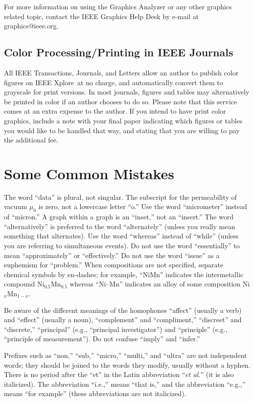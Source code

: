 \documentclass[journal,twoside,web]{ieeecolor}
\begin{document}
For more information on using the Graphics Analyzer or any other graphics
related topic, contact the IEEE Graphics Help Desk by e-mail at
graphics@ieee.org.

\subsection{Color Processing/Printing in IEEE Journals}
All IEEE Transactions, Journals, and Letters allow an author to publish
color figures on IEEE Xplore\textregistered\ at no charge, and automatically
convert them to grayscale for print versions. In most journals, figures and
tables may alternatively be printed in color if an author chooses to do so.
Please note that this service comes at an extra expense to the author. If
you intend to have print color graphics, include a note with your final
paper indicating which figures or tables you would like to be handled that way,
and stating that you are willing to pay the additional fee.

\section{Some Common Mistakes}
The word ``data'' is plural, not singular. The subscript for the
permeability of vacuum $\mu _{0}$ is zero, not a lowercase letter
``o.'' Use the word ``micrometer'' instead of ``micron.'' A graph within a graph is an
``inset,'' not an ``insert.'' The word ``alternatively'' is preferred to the
word ``alternately'' (unless you really mean something that alternates). Use
the word ``whereas'' instead of ``while'' (unless you are referring to
simultaneous events). Do not use the word ``essentially'' to mean
``approximately'' or ``effectively.'' Do not use the word ``issue'' as a
euphemism for ``problem.'' When compositions are not specified, separate
chemical symbols by en-dashes; for example, ``NiMn'' indicates the
intermetallic compound Ni$_{0.5}$Mn$_{0.5}$ whereas
``Ni--Mn'' indicates an alloy of some composition
Ni$_{x}$Mn$_{1-x}$.

Be aware of the different meanings of the homophones ``affect'' (usually a
verb) and ``effect'' (usually a noun), ``complement'' and ``compliment,''
``discreet'' and ``discrete,'' ``principal'' (e.g., ``principal
investigator'') and ``principle'' (e.g., ``principle of measurement''). Do
not confuse ``imply'' and ``infer.''

Prefixes such as ``non,'' ``sub,'' ``micro,'' ``multi,'' and ``ultra'' are
not independent words; they should be joined to the words they modify,
usually without a hyphen. There is no period after the ``et'' in the Latin
abbreviation ``\emph{et al.}'' (it is also italicized). The abbreviation ``i.e.,'' means
``that is,'' and the abbreviation ``e.g.,'' means ``for example'' (these
abbreviations are not italicized).
\end{document}
